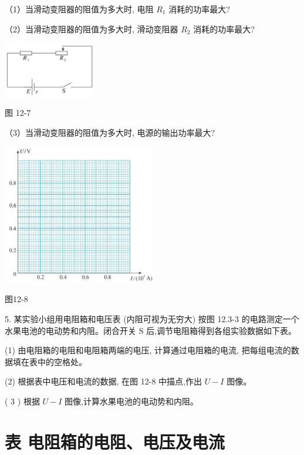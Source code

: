 \documentclass[10pt]{article}
\begin{document}
（1）当滑动变阻器的阻值为多大时, 电阻 \({R}_{1}\) 消耗的功率最大?

（2）当滑动变阻器的阻值为多大时, 滑动变阻器 \({R}_{2}\) 消耗的功率最大?

\begin{center}
\includegraphics[max width=0.3\textwidth]{images/01911d5f-8e38-70c0-b5b8-2b399bd115b6_106_836907.jpg}
\end{center}

图 12-7

（3）当滑动变阻器的阻值为多大时, 电源的输出功率最大?

\begin{center}
\includegraphics[max width=0.5\textwidth]{images/01911d5f-8e38-70c0-b5b8-2b399bd115b6_107_408855.jpg}
\end{center}

图12-8

5. 某实验小组用电阻箱和电压表 (内阻可视为无穷大) 按图 12.3-3 的电路测定一个水果电池的电动势和内阻。闭合开关 \(\mathrm{S}\) 后,调节电阻箱得到各组实验数据如下表。

(1) 由电阻箱的电阻和电阻箱两端的电压, 计算通过电阻箱的电流, 把每组电流的数据填在表中的空格处。

(2) 根据表中电压和电流的数据, 在图 12-8 中描点,作出 \(U - I\) 图像。

( 3 ) 根据 \(U - I\) 图像,计算水果电池的电动势和内阻。

\section*{表 电阻箱的电阻、电压及电流}
\end{document}

